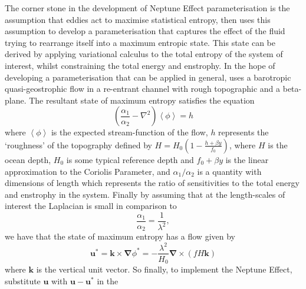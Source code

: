 \documentclass[12pt,a4paper]{report}
\begin{document}
                	The corner stone in the development of Neptune Effect parameterisation is the assumption that eddies act to maximise statistical entropy, \cite{holloway1992representing} then uses this assumption to develop a parameterisation that captures the effect of the fluid trying to rearrange itself into a maximum entropic state. This state can be derived by applying variational calculus to the total entropy of the system of interest, whilst
                	constraining the total energy and enstrophy. In the hope of developing a parameterisation that can be applied in general, \cite{holloway1992representing} uses a barotropic quasi-geostrophic flow in a re-entrant channel with rough topographic and a beta-plane. The resultant state of maximum entropy satisfies the equation 
                	\begin{equation}
                	\left(\frac{\alpha_{1}}{\alpha_{2}}-\nabla^{2}\right)\left\langle\phi\right\rangle=h
                	\end{equation} 
                	where  $\left\langle\phi\right\rangle$  
                	 is the expected stream-function of the flow, $h$ represents the `roughness' of the topography defined by 
                	  $H=H_{0}\left(1-\frac{h+\beta y}{f_{0}}\right)$, where $H$ is the ocean depth, $H_{0}$ is some typical reference  depth and $f_{0}+\beta y$ is the linear approximation to the Coriolis Parameter, and ${\alpha_{1}}/{\alpha_{2}}$ is a quantity with dimensions of length which represents the ratio of 
                	  sensitivities to the total energy and enstrophy in the system. Finally by
                	  assuming that at the length-scales of interest the Laplacian is small in
                	  comparison to
                	  \begin{equation*}
                	  \frac{\alpha_{1}}{\alpha_{2}}=\frac{1}{\lambda^{2}},
                	  \end{equation*} 
                	  we have that the state of maximum entropy has a flow given by  
                	\begin{equation}
                	\boldsymbol{u}^{\ast}=\boldsymbol{k}\times\boldsymbol{\nabla}\phi^{\ast}=
                	-\frac{\lambda^{2}}{H_{0}}
                	\boldsymbol{\nabla}\times \left(fH\boldsymbol{k}\right)
                	\end{equation}
                	where $\boldsymbol{k}$ is the vertical unit vector.
                	So finally, to implement the Neptune Effect, substitute $\boldsymbol{u}$ with $\boldsymbol{u}-\boldsymbol{u}^{\ast}$ in the
\end{document}
